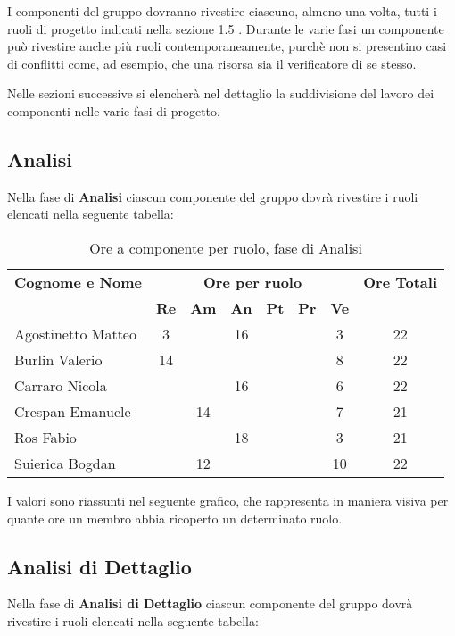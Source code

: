 I componenti del gruppo dovranno rivestire ciascuno, almeno una volta, tutti i ruoli di progetto indicati nella sezione 1.5 . Durante le varie fasi un componente può rivestire anche più ruoli contemporaneamente, purchè non si presentino casi di conflitti come, ad esempio, che una risorsa sia il verificatore di se stesso. 

\noindent Nelle sezioni successive si elencherà nel dettaglio la suddivisione del lavoro dei componenti nelle varie fasi di progetto.

\subsection{Analisi}
Nella fase di \textbf{Analisi} ciascun componente del gruppo dovrà rivestire i ruoli elencati nella seguente tabella:

\begin{table}[h]
\centering
\begin{tabular}{|l|c|c|c|c|c|c|c|}
\toprule
	\textbf{Cognome e Nome} & \multicolumn{6}{c}{\textbf{Ore per ruolo}} & \textbf{Ore Totali} \\
	& \textbf{Re} & \textbf{Am} & \textbf{An} & \textbf{Pt} & \textbf{Pr} & \textbf{Ve} & \\
	 
\midrule
	Agostinetto Matteo & 3 & & 16 & & & 3 & 22 \\
	Burlin Valerio & 14 & & & & & 8 & 22 \\ 
	Carraro Nicola & & & 16 & & & 6 & 22 \\
	Crespan Emanuele & & 14 & & & & 7 & 21 \\
	Ros Fabio & & & 18 & & & 3 & 21 \\
	Suierica Bogdan & & 12 & & & & 10 & 22 \\

\bottomrule
\end{tabular}
\caption{Ore a componente per ruolo, fase di Analisi}
\end{table}

I valori sono riassunti nel seguente grafico, che rappresenta in maniera visiva per quante ore un membro abbia ricoperto un determinato ruolo.

\subsection{Analisi di Dettaglio}
Nella fase di \textbf{Analisi di Dettaglio} ciascun componente del gruppo dovrà rivestire i ruoli elencati nella seguente tabella:

